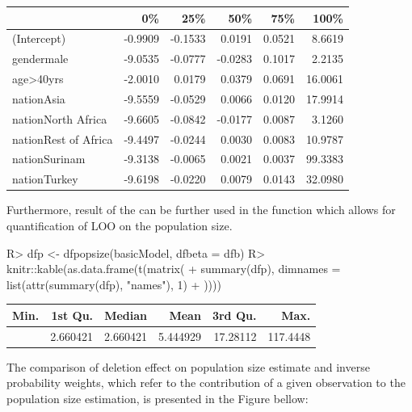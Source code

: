 \documentclass[
]{jss}
\newcommand{\1}{\mathcal{I}} \newcommand{\bZero}{\boldsymbol{0}}
\begin{document}
\begin{longtable}[]{@{}lrrrrr@{}}
\toprule\noalign{}
& 0\% & 25\% & 50\% & 75\% & 100\% \\
\midrule\noalign{}
\endhead
\bottomrule\noalign{}
\endlastfoot
(Intercept) & -0.9909 & -0.1533 & 0.0191 & 0.0521 & 8.6619 \\
gendermale & -9.0535 & -0.0777 & -0.0283 & 0.1017 & 2.2135 \\
age\textgreater40yrs & -2.0010 & 0.0179 & 0.0379 & 0.0691 & 16.0061 \\
nationAsia & -9.5559 & -0.0529 & 0.0066 & 0.0120 & 17.9914 \\
nationNorth Africa & -9.6605 & -0.0842 & -0.0177 & 0.0087 & 3.1260 \\
nationRest of Africa & -9.4497 & -0.0244 & 0.0030 & 0.0083 & 10.9787 \\
nationSurinam & -9.3138 & -0.0065 & 0.0021 & 0.0037 & 99.3383 \\
nationTurkey & -9.6198 & -0.0220 & 0.0079 & 0.0143 & 32.0980 \\
\end{longtable}

Furthermore, result of the  can be further used in the
function  which allows for quantification of LOO on the
population size.

\begin{CodeInput}
R> dfp <- dfpopsize(basicModel, dfbeta = dfb)
R> knitr::kable(as.data.frame(t(matrix(
+   summary(dfp), dimnames = list(attr(summary(dfp), "names"), 1)
+ ))))
\end{CodeInput}

\begin{longtable}[]{@{}rrrrrr@{}}
\toprule\noalign{}
Min. & 1st Qu. & Median & Mean & 3rd Qu. & Max. \\
\midrule\noalign{}
\endhead
\bottomrule\noalign{}
\endlastfoot
-4236.407 & 2.660421 & 2.660421 & 5.444929 & 17.28112 & 117.4448 \\
\end{longtable}

The comparison of deletion effect on population size estimate and
inverse probability weights, which refer to the contribution of a given
observation to the population size estimation, is presented in the
Figure bellow:
\end{document}

